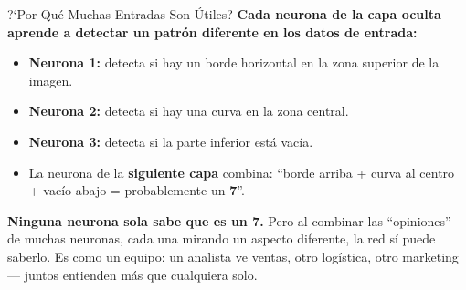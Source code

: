 \documentclass[aspectratio=169, 11pt]{beamer}
\begin{document}
\begin{frame}{?`Por Qu\'e Muchas Entradas Son \'Utiles?}
  \vspace{-4pt}
  {\footnotesize\color{arcaDark}\bfseries
    Cada neurona de la capa oculta aprende a detectar un
    \textbf{patr\'on diferente} en los datos de entrada:}

  \vspace{6pt}
  {\footnotesize
  \begin{itemize}\setlength{\itemsep}{5pt}
    \item[{\color{arcaRed}\scriptsize\faArrowRight}]
      \textbf{Neurona 1:} detecta si hay un borde horizontal en
      la zona superior de la imagen.
    \item[{\color{arcaRed}\scriptsize\faArrowRight}]
      \textbf{Neurona 2:} detecta si hay una curva en la zona central.
    \item[{\color{arcaRed}\scriptsize\faArrowRight}]
      \textbf{Neurona 3:} detecta si la parte inferior est\'a vac\'ia.
    \item[{\color{codeGreen}\scriptsize\faArrowRight}]
      La neurona de la \textbf{siguiente capa} combina: ``borde arriba
      + curva al centro + vac\'io abajo = probablemente un \textbf{7}''.
  \end{itemize}
  }

  \vspace{4pt}
  \begin{tcolorbox}[colback=arcaGray, colframe=arcaRed, boxrule=0.5pt, arc=2pt,
    left=6pt, right=6pt, top=4pt, bottom=4pt]
    {\scriptsize\color{arcaDark}
    \faKey\hspace{4pt}\textbf{Ninguna neurona sola sabe que es un 7.}
    Pero al combinar las ``opiniones'' de muchas neuronas, cada una
    mirando un aspecto diferente, la red s\'i puede saberlo.
    Es como un equipo: un analista ve ventas, otro log\'istica, otro
    marketing --- juntos entienden m\'as que cualquiera solo.}
  \end{tcolorbox}
\end{frame}
\end{document}
